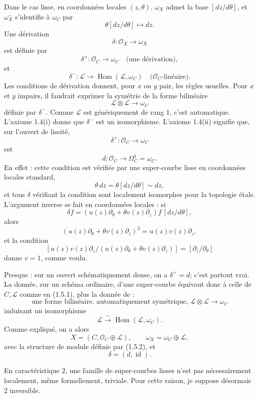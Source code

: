 \documentclass[11pt]{article}
\newcommand{\cO}{\mathcal O}
\newcommand{\cL}{\mathcal L}
\newcommand{\Hom}{\operatorname{Hom}}
\begin{document}
Dans le cas lisse, en coordonnées locales $(z,\theta)$, $\omega_X$ admet la base $[dz/d\theta]$, et $\omega_X^-$ s'identifie à $\omega_C$ par
\[
  \theta[dz/d\theta]\longmapsto dz.
\]
Une dérivation
\[
  \delta:\cO_X\longrightarrow\omega_X
\]
est définie par
\[
  \delta^+:\cO_C\longrightarrow\omega_C \quad\text{(une dérivation)},
\]
et
\[
  \delta^-:\cL\longrightarrow\Hom(\cL,\omega_C)
  \quad\text{($\cO_C$-linéaire)}.
\]
Les conditions de dérivation donnent, pour $x$ ou $y$ pair, les règles usuelles. Pour $x$ et $y$ impairs, il faudrait exprimer la symétrie de la forme bilinéaire
\[
  \cL\otimes\cL\longrightarrow\omega_C
\]
définie par $\delta^-$. Comme $\cL$ est génériquement de rang $1$, c'est automatique. L'axiome 1.4(i) donne que $\delta^-$ est un isomorphisme. L'axiome 1.4(ii) signifie que, sur l'ouvert de lissité,
\[
  \delta^+:\cO_C\longrightarrow\omega_C
\]
est
\[
  d:\cO_C\longrightarrow\Omega_C^1=\omega_C.
\]
En effet : cette condition est vérifiée par une super-courbe lisse en coordonnées locales standard,
\[
  \theta\,dz=\theta[dz/d\theta]\sim dz,
\]
et tous $\delta$ vérifiant la condition sont localement isomorphes pour la topologie étale. L'argument inverse se fait en coordonnées locales : si
\[
  \delta f=(u(z)\partial_\theta+\theta v(z)\partial_z)f\,[dz/d\theta],
\]
alors
\[
  (u(z)\partial_\theta+\theta v(z)\partial_z)^2=u(z)v(z)\partial_z,
\]
et la condition
\[
  [u(z)v(z)\partial_z/(u(z)\partial_\theta+\theta v(z)\partial_z)]=[\partial_z/\partial_\theta]
\]
donne $v=1$, comme voulu.

Presque : sur un ouvert schématiquement dense, on a $\delta^+=d$; c'est partout vrai. La donnée, sur un schéma ordinaire, d'une super-courbe équivaut donc à celle de $C,\cL$ comme en (1.5.1), plus la donnée de :
\begin{equation}\tag{1.5.2}
  \text{une forme bilinéaire, automatiquement symétrique, }
  \cL\otimes\cL\longrightarrow\omega_C
\end{equation}
induisant un isomorphisme
\[
  \cL\xrightarrow{\sim}\Hom(\cL,\omega_C).
\]
Comme expliqué, on a alors
\begin{equation}\tag{1.5.3}
  X=(C,\cO_C\oplus\cL),\qquad
  \omega_X=\omega_C\oplus\cL,
\end{equation}
avec la structure de module définie par (1.5.2), et
\[
  \delta=(d,\operatorname{id}).
\]

En caractéristique $2$, une famille de super-courbes lisses n'est pas nécessairement localement, même formellement, triviale. Pour cette raison, je suppose désormais $2$ inversible.
\end{document}
